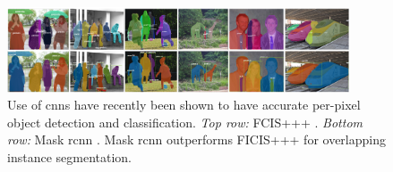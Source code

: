 \begin{figure}[p]
  \centering
  \includegraphics[width=0.9\textwidth]{images/background/he2017_maskrcnn}
  \caption[Use of CNNs for object detection]{Use of \glspl{cnn} have recently been shown to have accurate per-pixel object detection and classification. \textit{Top row:} FCIS+++ \citep{Li:2016uj}. \textit{Bottom row:} Mask \gls{rcnn} \citep{He:2017ud}. Mask \gls{rcnn} outperforms FICIS+++ for overlapping instance segmentation.}
  \label{fig:background:detection:learning:he2017_maskrcnn}
\end{figure}

\clearpage